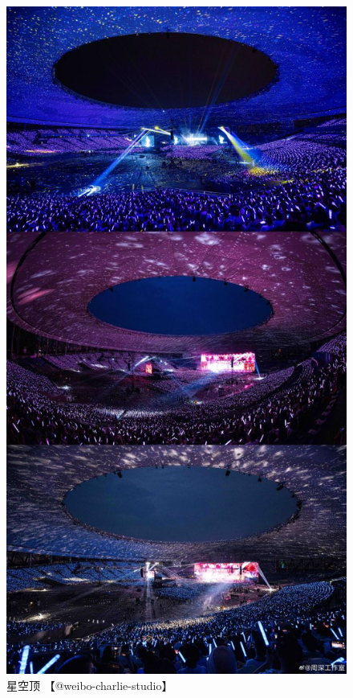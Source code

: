 \documentclass[]{ctexbook}
\begin{document}
\begin{figure}

{\centering \includegraphics[width=400pt]{img/chengdu20240615/003} 

}

\caption{星空顶 【@weibo-charlie-studio】}\label{fig:unnamed-chunk-53}
\end{figure}
\end{document}
